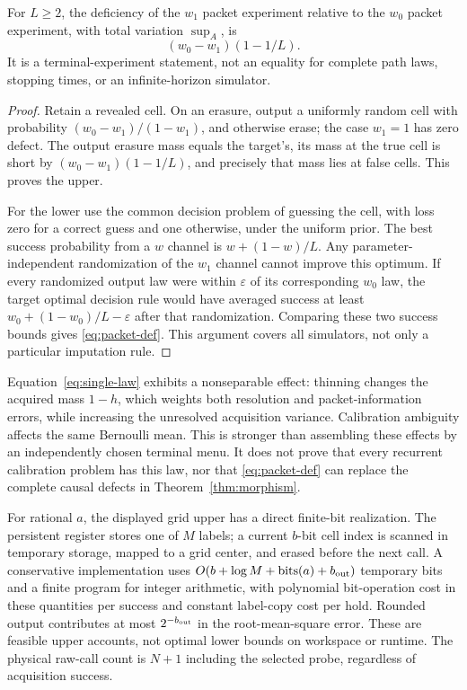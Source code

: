 \begin{proposition}\label{prop:terminal-deficiency}
For $L\ge2$, the deficiency of the $w_1$ packet experiment relative to the $w_0$ packet experiment, with total variation $\sup_A$, is
\begin{equation}\label{eq:packet-def}
 (w_0-w_1)(1-1/L).
\end{equation}
It is a terminal-experiment statement, not an equality for complete path laws, stopping times, or an infinite-horizon simulator.
\end{proposition}
\begin{proof}
Retain a revealed cell. On an erasure, output a uniformly random cell with probability $(w_0-w_1)/(1-w_1)$, and otherwise erase; the case $w_1=1$ has zero defect. The output erasure mass equals the target's, its mass at the true cell is short by $(w_0-w_1)(1-1/L)$, and precisely that mass lies at false cells. This proves the upper.

For the lower use the common decision problem of guessing the cell, with loss zero for a correct guess and one otherwise, under the uniform prior. The best success probability from a $w$ channel is $w+(1-w)/L$. Any parameter-independent randomization of the $w_1$ channel cannot improve this optimum. If every randomized output law were within $\varepsilon$ of its corresponding $w_0$ law, the target optimal decision rule would have averaged success at least $w_0+(1-w_0)/L-\varepsilon$ after that randomization. Comparing these two success bounds gives \eqref{eq:packet-def}. This argument covers all simulators, not only a particular imputation rule.
\end{proof}

Equation~\eqref{eq:single-law} exhibits a nonseparable effect: thinning changes the acquired mass $1-h$, which weights both resolution and packet-information errors, while increasing the unresolved acquisition variance. Calibration ambiguity affects the same Bernoulli mean. This is stronger than assembling these effects by an independently chosen terminal menu. It does not prove that every recurrent calibration problem has this law, nor that \eqref{eq:packet-def} can replace the complete causal defects in Theorem~\ref{thm:morphism}.

For rational $a$, the displayed grid upper has a direct finite-bit realization. The persistent register stores one of $M$ labels; a current $b$-bit cell index is scanned in temporary storage, mapped to a grid center, and erased before the next call. A conservative implementation uses $O(b+\log M+\operatorname{bits}(a)+b_{\rm out})$ temporary bits and a finite program for integer arithmetic, with polynomial bit-operation cost in these quantities per success and constant label-copy cost per hold. Rounded output contributes at most $2^{-b_{\rm out}}$ in the root-mean-square error. These are feasible upper accounts, not optimal lower bounds on workspace or runtime. The physical raw-call count is $N+1$ including the selected probe, regardless of acquisition success.
